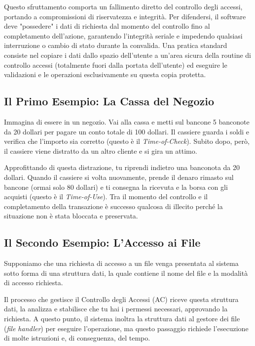 \documentclass{article}
\begin{document}
Questo sfruttamento comporta un fallimento diretto del controllo degli accessi, portando a compromissioni di riservatezza e integrità. Per difendersi, il software deve "possedere" i dati di richiesta dal momento del controllo fino al completamento dell'azione, garantendo l'integrità seriale e impedendo qualsiasi interruzione o cambio di stato durante la convalida. Una pratica standard consiste nel copiare i dati dallo spazio dell'utente a un'area sicura della routine di controllo accessi (totalmente fuori dalla portata dell'utente) ed eseguire le validazioni e le operazioni esclusivamente su questa copia protetta.

\subsection*{Il Primo Esempio: La Cassa del Negozio}

Immagina di essere in un negozio. Vai alla cassa e metti sul bancone 5 banconote da 20 dollari per pagare un conto totale di 100 dollari. Il cassiere guarda i soldi e verifica che l'importo sia corretto (questo è il \textit{Time-of-Check}). Subito dopo, però, il cassiere viene distratto da un altro cliente e si gira un attimo.

Approfittando di questa distrazione, tu riprendi indietro una banconota da 20 dollari. Quando il cassiere si volta nuovamente, prende il denaro rimasto sul bancone (ormai solo 80 dollari) e ti consegna la ricevuta e la borsa con gli acquisti (questo è il \textit{Time-of-Use}). Tra il momento del controllo e il completamento della transazione è successo qualcosa di illecito perché la situazione non è stata bloccata e preservata.

\subsection*{Il Secondo Esempio: L'Accesso ai File}

Supponiamo che una richiesta di accesso a un file venga presentata al sistema sotto forma di una struttura dati, la quale contiene il nome del file e la modalità di accesso richiesta.

Il processo che gestisce il Controllo degli Accessi (AC) riceve questa struttura dati, la analizza e stabilisce che tu hai i permessi necessari, approvando la richiesta. A questo punto, il sistema inoltra la struttura dati al gestore dei file (\textit{file handler}) per eseguire l'operazione, ma questo passaggio richiede l'esecuzione di molte istruzioni e, di conseguenza, del tempo.
\end{document}
